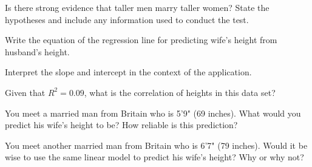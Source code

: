 {\begin{parts}
\item Is there strong evidence that taller men marry taller women? State the hypotheses and include any information used to conduct the test.
\item Write the equation of the regression line for predicting wife's height from husband's height.
\item Interpret the slope and intercept in the context of the application.
\item Given that $R^2 = 0.09$, what is the correlation of heights in this data set?
\item You meet a married man from Britain who is 5'9" (69 inches). What would you predict his wife's height to be? How reliable is this prediction?
\item You meet another married man from Britain who is 6'7" (79 inches). Would it be wise to use the same linear model to predict his wife's height? Why or why not?
\end{parts}
}{}



